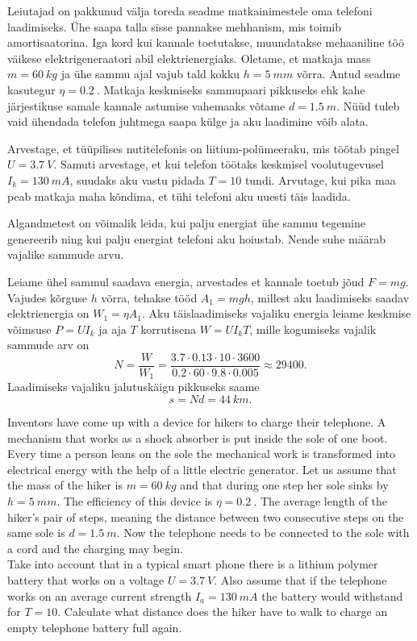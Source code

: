 
Leiutajad on pakkunud välja toreda seadme matkainimestele oma telefoni laadimiseks. Ühe saapa talla sisse pannakse mehhanism, mis toimib amortisaatorina. Iga kord kui kannale toetutakse, muundatakse mehaaniline töö väikese elektrigeneraatori abil elektrienergiaks. Oletame, et matkaja mass $m=\SI{60}{kg}$ ja ühe sammu ajal vajub tald kokku 
$h=\SI{5}{mm}$ võrra. Antud seadme kasutegur $\eta = \SI{0,2}{}$. Matkaja keskmiseks sammupaari pikkuseks ehk kahe järjestikuse samale kannale astumise vahemaaks võtame $d=\SI{1.5}{m}$. Nüüd tuleb vaid ühendada telefon juhtmega saapa külge ja aku laadimine võib alata.

Arvestage, et tüüpilises nutitelefonis on liitium-polümeeraku, mis töötab pingel $U=\SI{3.7}{V}$. Samuti arvestage, et kui telefon töötaks keskmisel voolutugevusel $I_k=\SI{130}{mA}$, suudaks aku vastu pidada $T=10$ tundi. Arvutage, kui pika maa peab matkaja maha kõndima, et tühi telefoni aku uuesti täis laadida.

\hint
Algandmetest on võimalik leida, kui palju energiat ühe sammu tegemine genereerib ning kui palju energiat telefoni aku hoiustab. Nende suhe määrab vajalike sammude arvu.

\solu
Leiame ühel sammul saadava energia, arvestades et kannale toetub jõud $F=mg$. Vajudes kõrguse $h$ võrra, tehakse tööd $A_1 = mgh$, millest aku laadimiseks saadav elektrienergia on $W_1=\eta A_1$. 
Aku täislaadimiseks vajaliku energia leiame keskmise võimsuse $P=UI_k$ ja aja $T$ korrutisena $W=UI_kT$, mille kogumiseks vajalik sammude arv on
\[N = \frac{W}{W_1} = \frac{3.7 \cdot 0.13 \cdot 10 \cdot 3600 }{0.2 \cdot 60\cdot 9.8 \cdot 0.005}\approx29400.\]
Laadimiseks vajaliku jalutuskäigu pikkuseks saame
\[s=Nd = \SI{44}{km}.\]

Inventors have come up with a device for hikers to charge their telephone. A mechanism that works as a shock absorber is put inside the sole of one boot. Every time a person leans on the sole the mechanical work is transformed into electrical energy with the help of a little electric generator. Let us assume that the mass of the hiker is $m=\SI{60}{kg}$ and that during one step her sole sinks by $h=\SI{5}{mm}$. The efficiency of this device is $\eta = \SI{0,2}{}$. The average length of the hiker’s pair of steps, meaning the distance between two consecutive steps on the same sole is $d=\SI{1.5}{m}$. Now the telephone needs to be connected to the sole with a cord and the charging may begin.\\
Take into account that in a typical smart phone there is a lithium polymer battery that works on a voltage $U=\SI{3.7}{V}$. Also assume that if the telephone works on an average current strength $I_a=\SI{130}{mA}$ the battery would withstand for $T=10$. Calculate what distance does the hiker have to walk to charge an empty telephone battery full again.

